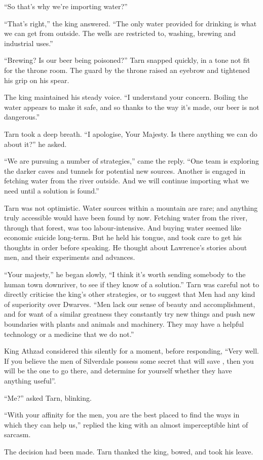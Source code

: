 ``So that's why we're importing water?''

``That's right,'' the king answered.  ``The only water provided for drinking is what we can get from outside.  The wells are restricted to, washing, brewing and industrial uses.''

``Brewing?  Is our beer being poisoned?'' Tarn snapped quickly, in a tone not fit for the throne room.  The guard by the throne raised an eyebrow and tightened his grip on his spear.

The king maintained his steady voice.  ``I understand your concern.  Boiling the water appears to make it safe, and so thanks to the way it's made, our beer is not dangerous.''

Tarn took a deep breath.  ``I apologise, Your Majesty.  Is there anything we can do about it?'' he asked.

``We are pursuing a number of strategies,'' came the reply.  ``One team is exploring the darker caves and tunnels for potential new sources.  Another is engaged in fetching water from the river outside.  And we will continue importing what we need until a solution is found.''

Tarn was not optimistic.  Water sources within a mountain are rare; and anything truly accessible would have been found by now.  Fetching water from the river, through that forest, was too labour-intensive.  And buying water seemed like economic suicide long-term.  But he held his tongue, and took care to get his thoughts in order before speaking.  He thought about Lawrence's stories about men, and their experiments and advances.

``Your majesty,'' he began slowly, ``I think it's worth sending somebody to the human town downriver, to see if they know of a solution.''  Tarn was careful not to directly criticise the king's other strategies, or to suggest that Men had any kind of superiority over Dwarves.
``Men lack our sense of beauty and accomplishment, and for want of a similar greatness they constantly try new things and push new boundaries with plants and animals and machinery.  They may have a helpful technology or a medicine that we do not.''

King Athzad considered this silently for a moment, before responding, ``Very well.  If you believe the men of Silverdale possess some secret that will save \korbarthrond, then you will be the one to go there, and determine for yourself whether they have anything useful''.

``Me?'' asked Tarn, blinking.

``With your affinity for the men, you are the best placed to find the ways in which they can help us,'' replied the king with an almost imperceptible hint of sarcasm.

The decision had been made.  Tarn thanked the king, bowed, and took his leave.